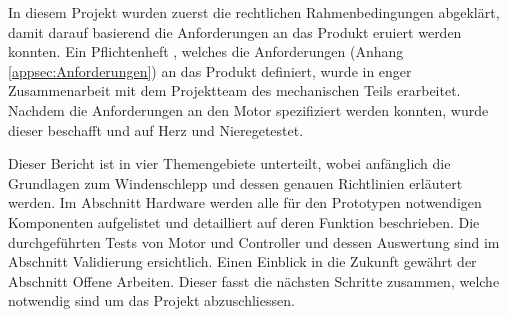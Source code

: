 In diesem Projekt wurden zuerst die rechtlichen Rahmenbedingungen abgeklärt, damit darauf basierend die Anforderungen an das Produkt eruiert werden konnten. Ein Pflichtenheft \cite{TechPflichtenheft}, welches die Anforderungen (Anhang \ref{appsec:Anforderungen}) an das Produkt definiert, wurde in enger Zusammenarbeit mit dem Projektteam des mechanischen Teils erarbeitet. Nachdem die Anforderungen an den Motor spezifiziert werden konnten, wurde dieser beschafft und auf \glqq Herz und Niere\grqq\space getestet.

Dieser Bericht ist in vier Themengebiete unterteilt, wobei anfänglich die Grundlagen zum Windenschlepp und dessen genauen Richtlinien erläutert werden. Im Abschnitt Hardware werden alle für den Prototypen notwendigen Komponenten aufgelistet und detailliert auf deren Funktion beschrieben. Die durchgeführten Tests von Motor und Controller und dessen Auswertung sind im Abschnitt Validierung ersichtlich. Einen Einblick in die Zukunft gewährt der Abschnitt Offene Arbeiten. Dieser fasst die nächsten Schritte zusammen, welche notwendig sind um das Projekt abzuschliessen.

